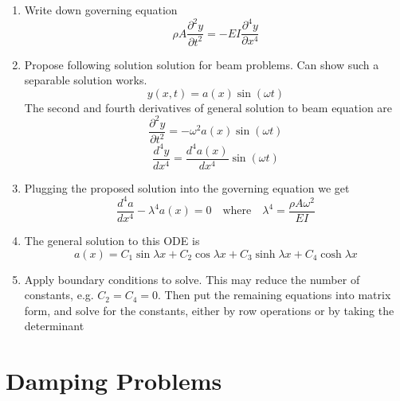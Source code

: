 \documentclass[letterpaper,twocolumn,notitlepage]{article}
\begin{document}
  \begin{enumerate}
    \item{Write down governing equation}
    \begin{equation*}
      \boxed{\rho A\frac{\partial^{2}y}{\partial t^{2}}=-EI\frac{\partial^{4}y}{\partial x^{4}}}
    \end{equation*}
    \item{%
      Propose following solution solution for beam problems.
      Can show such a separable solution works.
    }
    \begin{equation*}
      \boxed{y(x,t)=a(x)\sin(\omega t)}
    \end{equation*}
    The second and fourth derivatives of general solution to beam equation are
    \begin{equation*}
      \frac{\partial^{2}y}{\partial t^{2}}=-\omega^{2}a(x)\sin(\omega t)
    \end{equation*}
    \begin{equation*}
      \frac{d^{4}y}{dx^{4}}=\frac{d^{4}a(x)}{dx^{4}}\sin(\omega t)
    \end{equation*}
    \item{Plugging the proposed solution into the governing equation we get}
    \begin{equation*}
      \boxed{\frac{d^{4}a}{dx^{4}}-\lambda^{4}a(x)=0}
      \quad
      \text{where}
      \quad
      \boxed{\lambda^{4}=\frac{\rho A\omega^{2}}{EI}}
    \end{equation*}
    \item{The general solution to this ODE is}
    \begin{equation*}
      \boxed{a(x)=C_{1}\sin\lambda x+C_{2}\cos\lambda x+C_{3}\sinh\lambda x+C_{4}\cosh\lambda x}
    \end{equation*}
    \item{%
      Apply boundary conditions to solve.
      This may reduce the number of constants, e.g. $C_{2}=C_{4}=0$.
      Then put the remaining equations into matrix form, and solve for the constants, either by row operations or by taking the determinant
    }
  \end{enumerate}

  \section*{Damping Problems}
\end{document}
